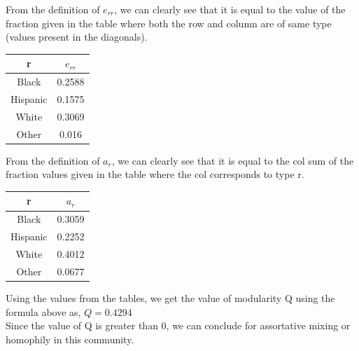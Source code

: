 \documentclass{article}
\begin{document}
From the definition of $e_{rr}$, we can clearly see that it is equal to the value of the fraction given in the table where both the row and column are of same type (values present in the diagonals).

\begin{table}[h!]
\centering
\begin{tabular}{ |c|c| } 
\hline
r & $e_{rr}$ \\
\hline
Black & 0.2588\\
Hispanic & 0.1575\\
White & 0.3069\\
Other & 0.016\\
\hline
\end{tabular}
\label{table:1}
\end{table}

From the definition of $a_r$, we can clearly see that it is equal to the col sum of the fraction values given in the table where the col corresponds to type r. 

\begin{table}[h!]
\centering
\begin{tabular}{ |c|c| } 
\hline
r & $a_{r}$ \\
\hline
Black & 0.3059\\
Hispanic & 0.2252\\
White & 0.4012\\
Other & 0.0677\\
\hline
\end{tabular}
\label{table:2}
\end{table}

Using the values from the tables, we get the value of modularity Q using the formula above as,  $Q = 0.4294$\\

Since the value of Q is greater than 0, we can conclude for assortative mixing or homophily in this community.
\newpage
\end{document}
